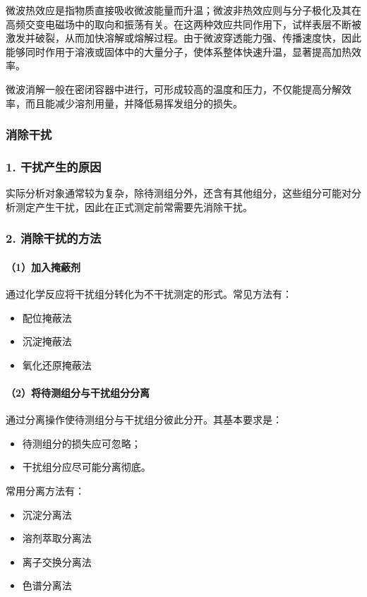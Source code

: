 \documentclass[12pt,a4paper]{article}
\numberwithin{equation}{section}
\begin{document}
微波热效应是指物质直接吸收微波能量而升温；微波非热效应则与分子极化及其在高频交变电磁场中的取向和振荡有关。在这两种效应共同作用下，试样表层不断被激发并破裂，从而加快溶解或熔解过程。由于微波穿透能力强、传播速度快，因此能够同时作用于溶液或固体中的大量分子，使体系整体快速升温，显著提高加热效率。

微波消解一般在密闭容器中进行，可形成较高的温度和压力，不仅能提高分解效率，而且能减少溶剂用量，并降低易挥发组分的损失。

\subsubsection{消除干扰}

\subsubsection*{1. 干扰产生的原因}

实际分析对象通常较为复杂，除待测组分外，还含有其他组分，这些组分可能对分析测定产生干扰，因此在正式测定前常需要先消除干扰。

\subsubsection*{2. 消除干扰的方法}

\paragraph{（1）加入掩蔽剂}
通过化学反应将干扰组分转化为不干扰测定的形式。常见方法有：
\begin{itemize}
    \item 配位掩蔽法
    \item 沉淀掩蔽法
    \item 氧化还原掩蔽法
\end{itemize}

\paragraph{（2）将待测组分与干扰组分分离}
通过分离操作使待测组分与干扰组分彼此分开。其基本要求是：
\begin{itemize}
    \item 待测组分的损失应可忽略；
    \item 干扰组分应尽可能分离彻底。
\end{itemize}

常用分离方法有：
\begin{itemize}
    \item 沉淀分离法
    \item 溶剂萃取分离法
    \item 离子交换分离法
    \item 色谱分离法
\end{itemize}
\end{document}
